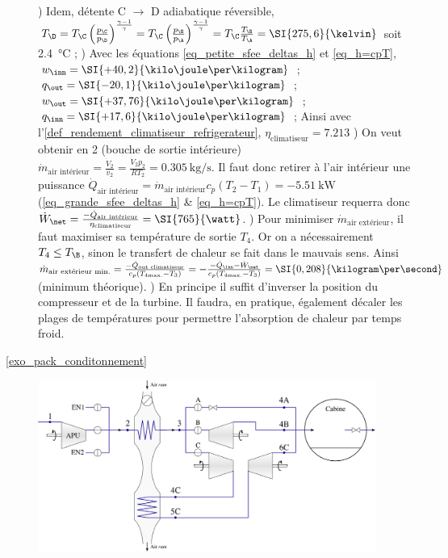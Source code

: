 \begin{description}
				) Idem, détente C $\to$ D adiabatique réversible, $T_\D = T_\C \left(\frac{p_\C}{p_\D}\right)^{\frac{\gamma - 1}{\gamma}} = T_\C \left(\frac{p_\B}{p_\A}\right)^{\frac{\gamma - 1}{\gamma}} = T_\C \frac{T_\B}{T_\A} = \SI{275,6}{\kelvin}$ soit \SI{2,4}{\degreeCelsius} ;
				) Avec les équations \ref{eq_petite_sfee_deltas_h} et \ref{eq_h=cpT}, $w_\inn = \SI{+40,2}{\kilo\joule\per\kilogram}$ ; 
						$q_\out = \SI{-20,1}{\kilo\joule\per\kilogram}$ ; 
						$w_\out = \SI{+37,76}{\kilo\joule\per\kilogram}$ ; 
						$q_\inn = \SI{+17,6}{\kilo\joule\per\kilogram}$ ; 
						Ainsi avec l’\cref{def_rendement_climatiseur_refrigerateur}, $\eta_\text{climatiseur} = \num{7,213}$
				) On veut obtenir en 2 (bouche de sortie intérieure) $\dot m_\text{air intérieur} = \frac{\dot V_2}{v_2} = \frac{\dot V_2 p_2}{R T_2} = \SI{0,305}{\kilogram\per\second}$. 
						Il faut donc retirer à l’air intérieur une puissance $\dot Q_\text{air intérieur} = \dot m_\text{air intérieur} c_p (T_2 - T_1) = \SI{-5,51}{\kilo\watt}$ (\ref{eq_grande_sfee_deltas_h} \& \ref{eq_h=cpT}).
						Le climatiseur requerra donc $\dot W_\net = \frac{-\dot Q_\text{air intérieur}}{\eta_\text{climatiseur}} = \SI{765}{\watt}$.
				) Pour minimiser $\dot m_\text{air extérieur}$, il faut maximiser sa température de sortie $T_4$. Or on a nécessairement $T_4 \leq T_\B$, sinon le transfert de chaleur se fait dans le mauvais sens. Ainsi $\dot m_\text{air extérieur min.} = \frac{-\dot Q_\text{out climatiseur}}{c_p (T_{4 \text{max.}} - T_3)} = -\frac{-\dot Q_\inn - \dot W_\net}{c_p (T_{4 \text{max.}} - T_3)} = \SI{0,208}{\kilogram\per\second}$ (minimum théorique).
				\tab{}) En principe il suffit d’inverser la position du compresseur et de la turbine. Il faudra, en pratique, également décaler les plages de températures pour permettre l’absorption de chaleur par temps froid.
	\item[\ref{exo_pack_conditonnement}]
			\includegraphics[width=0.9\textwidth]{images/exo_sol_circuit_acm.png}\onlyamphibook{\\}

\end{description}
